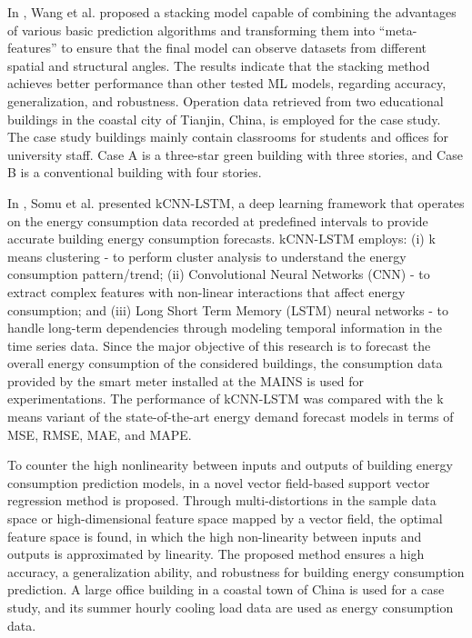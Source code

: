 In \cite{WANG2020114561}, Wang et al. proposed a stacking model capable of combining the advantages of various basic prediction algorithms and transforming them into “meta-features” to ensure that the final model can observe datasets from different spatial and structural angles.
The results indicate that the stacking method achieves better performance than other tested ML models, regarding accuracy, generalization, and robustness.
Operation data retrieved from two educational buildings in the coastal city of Tianjin, China, is employed for the case study. The case study buildings mainly contain classrooms for students and offices for university staff. Case A is a three-star green building with three stories, and Case B is a conventional building with four stories.

In \cite{SOMU2021110591}, Somu et al. presented kCNN-LSTM, a deep learning framework that operates on the energy consumption data recorded at predefined intervals to provide accurate building energy consumption forecasts.
kCNN-LSTM employs:
(i) k means clustering - to perform cluster analysis to understand the energy consumption pattern\slash trend;
(ii) Convolutional Neural Networks (CNN) - to extract complex features with non-linear interactions that affect energy consumption;
and (iii) Long Short Term Memory (LSTM) neural networks - to handle long-term dependencies through modeling temporal information in the time series data.
Since the major objective of this research is to forecast the overall energy consumption of the considered buildings, the consumption data provided by the smart meter installed at the MAINS is used for experimentations.
The performance of kCNN-LSTM was compared with the k means variant of the state-of-the-art energy demand forecast models in terms of MSE, RMSE, MAE, and MAPE.

To counter the high nonlinearity between inputs and outputs of building energy consumption prediction models, in \cite{ZHONG2019403} a novel vector field-based support vector regression method is proposed.
Through multi-distortions in the sample data space or high-dimensional feature space mapped by a vector field, the optimal feature space is found, in which the high non-linearity between inputs and outputs is approximated by linearity. 
The proposed method ensures a high accuracy, a generalization ability, and robustness for building energy consumption prediction.
A large office building in a coastal town of China is used for a case study, and its summer hourly cooling load data are used as energy consumption data.

